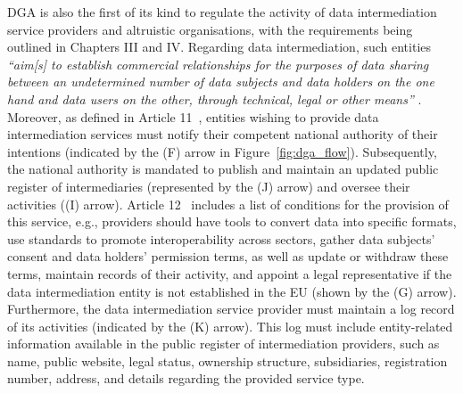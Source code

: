 DGA is also the first of its kind to regulate the activity of data intermediation service providers and altruistic organisations, with the requirements being outlined in Chapters III and IV.
Regarding data intermediation, such entities \textit{``aim[s] to establish commercial relationships for the purposes of data sharing between an undetermined number of data subjects and data holders on the one hand and data users on the other, through technical, legal or other means''} \citeyearpar{noauthor_regulation_2022}.
Moreover, as defined in Article 11~\citeyearpar{noauthor_regulation_2022}, entities wishing to provide data intermediation services must notify their competent national authority of their intentions (indicated by the (F) arrow in Figure~\ref{fig:dga_flow}).
Subsequently, the national authority is mandated to publish and maintain an updated public register of intermediaries (represented by the (J) arrow) and oversee their activities ((I) arrow).
Article 12~\citeyearpar{noauthor_regulation_2022} includes a list of conditions for the provision of this service, e.g., providers should have tools to convert data into specific formats, use standards to promote interoperability across sectors, gather data subjects' consent and data holders' permission terms, as well as update or withdraw these terms, maintain records of their activity, and appoint a legal representative if the data intermediation entity is not established in the EU (shown by the (G) arrow).
Furthermore, the data intermediation service provider must maintain a log record of its activities (indicated by the (K) arrow).
This log must include entity-related information available in the public register of intermediation providers, such as name, public website, legal status, ownership structure, subsidiaries, registration number, address, and details regarding the provided service type.

